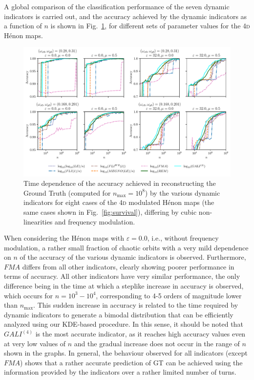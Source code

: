 A global comparison of the classification performance of the seven dynamic indicators is carried out, and the accuracy achieved by the dynamic indicators as a function of $n$ is shown in Fig.~\ref{fig:performance}, for different sets of parameter values for the 4\textsc{d} Hénon maps. 

\begin{figure}[htp]
    \centering
    \includegraphics[width=1.0\textwidth]{6_dynamic_indicators/fig/corrected_figs/performance.pdf}
    \caption{Time dependence of the accuracy achieved in reconstructing the Ground Truth (computed for $n_\text{max}=10^8$) by the various dynamic indicators for eight cases of the 4\textsc{d} modulated Hénon maps (the same cases shown in Fig.~\ref{fig:survival}), differing by cubic non-linearities and frequency modulation.}
    \label{fig:performance}
\end{figure}

When considering the Hénon maps with $\varepsilon=0.0$, i.e., without frequency modulation, a rather small fraction of chaotic orbits with a very mild dependence on $n$ of the accuracy of the various dynamic indicators is observed. Furthermore, $FMA$ differs from all other indicators, clearly showing poorer performance in terms of accuracy. All other indicators have very similar performance, the only difference being in the time at which a steplike increase in accuracy is observed, which occurs for $n = 10^3 - 10^4$, corresponding to 4-5 orders of magnitude lower than $n_\text{max}$. This sudden increase in accuracy is related to the time required by dynamic indicators to generate a bimodal distribution that can be efficiently analyzed using our KDE-based procedure. In this sense, it should be noted that $GALI^{(4)}$ is the most accurate indicator, as it reaches high accuracy values even at very low values of $n$ and the gradual increase does not occur in the range of $n$ shown in the graphs. In general, the behaviour observed for all indicators (except $FMA$) shows that a rather accurate prediction of GT can be achieved using the information provided by the indicators over a rather limited number of turns.

